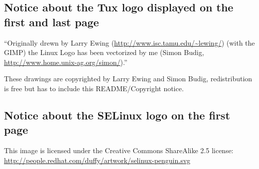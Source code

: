 \documentclass[pdftex,a4paper,titlepage,11pt]{article}
\newcommand{\lastPage}{
	\newpage
	\strut
	\fancyhf{}
	\renewcommand{\headrulewidth}{0pt}
	\addtocounter{page}{-1}
	\AddToShipoutPicture*{\BackgroundPic{Tux_n&b_half_1.png}}
	\newpage
}
\newcommand\BackgroundPic[1]{
	\put(0,-100){
		\parbox[b][\paperheight]{\paperwidth}{
			\vfill
			\centering
			\texttt{[image: \#1]}
			\vfill
		}
	}
}
\begin{document}
\subsection*{Notice about the Tux logo displayed on the first and last page}
``Originally drewn by Larry Ewing (\url{http://www.isc.tamu.edu/~lewing/}) (with
the GIMP) the Linux Logo has been vectorized by me (Simon Budig,
\url{http://www.home.unix-ag.org/simon/}).''

\bigskip

These drawings are copyrighted by Larry Ewing and Simon Budig, redistribution is
free but has to include this README/Copyright notice.

\subsection*{Notice about the SELinux logo on the first page}
This image is licensed under the Creative Commons ShareAlike 2.5 license:
\url{http://people.redhat.com/duffy/artwork/selinux-penguin.svg}

\lastPage
\end{document}
